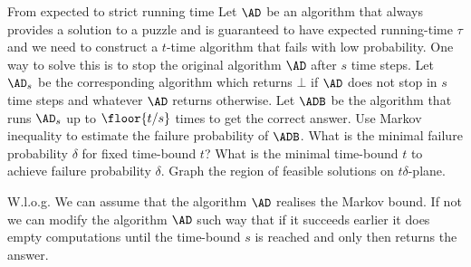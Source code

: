 \documentclass{crypto-exercise}
\author[Formalisation of folklore]{Sven Laur}
\begin{document}
\begin{exercise}{From expected to strict running time}
Let $\AD$ be an algorithm that always provides a solution to a puzzle and is guaranteed to have expected running-time $\tau$ and we need to construct a $t$-time algorithm that fails with low probability. One way to solve this is to stop the original algorithm $\AD$ after $s$ time steps. Let $\AD_s$ be the corresponding algorithm which returns $\bot$ if $\AD$ does not stop in $s$ time steps and  whatever $\AD$ returns otherwise. Let $\ADB$ be the algorithm that runs $\AD_s$ up to $\floor{t/s}$ times to get the correct answer.
Use Markov inequality to estimate the failure probability of $\ADB$.  What is the minimal failure probability $\delta$ for fixed time-bound $t$? What is the minimal time-bound $t$ to achieve failure probability $\delta$. Graph the region of feasible solutions on $t\delta$-plane. \\ 
\end{exercise}

\begin{solution}
W.l.o.g. We can assume that the algorithm $\AD$  realises the Markov bound. If not we can modify the algorithm $\AD$ such way that if it succeeds earlier it does empty computations until the time-bound $s$ is reached and only then returns the answer.  


\end{solution}
\end{document}
